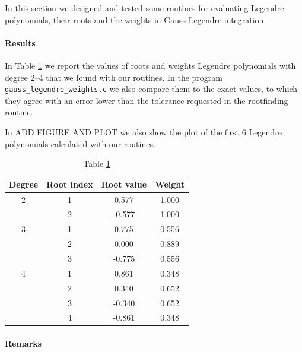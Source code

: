 \documentclass[a4paper,11]{article}
\newcommand{\mdcode}[1]{\lstinline[backgroundcolor=\color{gray!10}, frame=single, frameround=tttt]|#1|}
\begin{document}
In this section we designed and tested some routines for evaluating Legendre
polynomials, their roots and the weights in Gauss-Legendre integration.

\paragraph{Results}

In Table \ref{table:legendre_nodes_weights} we report the values of roots and
weights Legendre polynomials with degree 2--4 that we found with our 
routines. In the program \mdcode{gauss_legendre_weights.c} we also compare 
them to the exact values, to which they agree with an error lower than the 
tolerance requested in the rootfinding routine.

In ADD FIGURE AND PLOT we also show the plot of the first 6 Legendre polynomials
calculated with our routines.

\begin{table}[ht]
	\centering
	\begin{tabular}{c | c | c | c}
		Degree & Root index & Root value & Weight \\
		\hline
		2 & 1 &  0.577 & 1.000 \\
		  & 2 & -0.577 & 1.000 \\
		3 & 1 &  0.775 & 0.556 \\
		  & 2 &  0.000 & 0.889 \\
		  & 3 & -0.775 & 0.556 \\
		4 & 1 &  0.861 & 0.348 \\
		  & 2 &  0.340 & 0.652 \\
		  & 3 & -0.340 & 0.652 \\
		  & 4 & -0.861 & 0.348
	\end{tabular}
	\caption{Table \ref{table:legendre_nodes_weights}}
	\label{table:legendre_nodes_weights}
\end{table}

\paragraph{Remarks}
\end{document}
